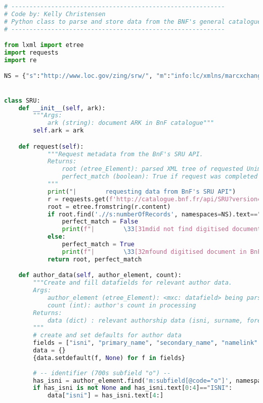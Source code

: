 \documentclass[class=article, crop=false]{standalone}
\begin{document}
\begin{lstlisting}[language=python, style=python]
# -----------------------------------------------------------
# Code by: Kelly Christensen
# Python class to parse and store data from the BNF's general catalogue.
# -----------------------------------------------------------

from lxml import etree
import requests
import re

NS = {"s":"http://www.loc.gov/zing/srw/", "m":"info:lc/xmlns/marcxchange-v2"}


class SRU:
    def __init__(self, ark):
        """Args:
            ark (string): document ARK in BnF catalogue"""
        self.ark = ark

    def request(self):
            """Request metadata from the BnF's SRU API.
            Returns:
                root (etree_Element): parsed XML tree of requested Unimarc data
                perfect_match (boolean): True if request was completed with Gallica ark / directory basename
            """    
            print("|        requesting data from BnF's SRU API")
            r = requests.get(f'http://catalogue.bnf.fr/api/SRU?version=1.2&operation=searchRetrieve&query=(bib.persistentid all "ark:/12148/{self.ark}")')
            root = etree.fromstring(r.content)
            if root.find('.//s:numberOfRecords', namespaces=NS).text=="0":
                perfect_match = False
                print(f"|        \33[31mdid not find digitised document in BnF catalogue\x1b[0m")
            else:
                perfect_match = True
                print(f"|        \33[32mfound digitised document in BnF catalogue\x1b[0m")
            return root, perfect_match

    def author_data(self, author_element, count):
        """Create and fill datafields for relevant author data.
        Args:
            author_element (etree_Element): <mxc: datafield> being parsed
            count (int): author's count in processing
        Returns:
            data (dict) : relevant authorship data (isni, surname, forename, xml:id)
        """        
        # create and set defaults for author data
        fields = ["isni", "primary_name", "secondary_name", "namelink" , "xmlid"]
        data = {}
        {data.setdefault(f, None) for f in fields}
        
        # -- identifier (700s subfield "o") --
        has_isni = author_element.find('m:subfield[@code="o"]', namespaces=NS)
        if has_isni is not None and has_isni.text[0:4]=="ISNI":
            data["isni"] = has_isni.text[4:]


\end{lstlisting}
\end{document}
